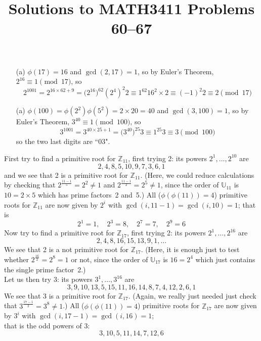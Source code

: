 \documentclass[11pt]{article}
\date{}
\author{}
\title{\sc Solutions to MATH3411 Problems 60--67}
\begin{document}
 \maketitle

\vspace*{-10mm}

\begin{itemize}
  \item[{(a)}] $\phi(17) = 16$ and $\gcd(2,17)=1$, so by Euler's Theorem, $2^{16}\equiv1\pmod{17}$, so
    \[2^{1001} = 2^{16\times 62+9} = \bigl(2^{16}\bigr)^{62}(2^4)^2 2 \equiv 1^{62}16^2\times2\equiv(-1)^2 2\equiv 2\pmod{17}\]
  \item[{(a)}] $\phi(100) = \phi(2^2)\phi(5^2) = 2\times 20 = 40$ and $\gcd(3,100)=1$, so by Euler's Theorem, $3^{40}\equiv1\pmod{100}$, so
    \[3^{1001} = 3^{40\times 25+1} = \bigl(3^{40}\bigr)^{25}3 \equiv 1^{25}3\equiv 3\pmod{100}\]
    so the two last digits are ``03".
\end{itemize}

\bigskip{}
First try to find a primitive root for $\mathbb{Z}_{11}$,
first trying 2: its powers $2^1,\ldots,2^{10}$ are
\[
  2, 4, 8, 5, 10, 9, 7, 3, 6, 1
\]
and we see that 2 is a primitive root for $\mathbb{Z}_{11}$.
(Here, we could reduce calculations by checking
that $2^\frac{11-1}{5} = 2^2 \neq 1$
and  $2^\frac{11-1}{2} = 2^5 \neq 1$,
since the order of $\mathbb{U}_{11}$ is $10 = 2\times 5$ which has prime factors~2 and~5.)
All ($\phi(\phi(11)) = 4$) primitive roots for $\mathbb{Z}_{11}$ are now given by $2^i$ with $\gcd(i,11-1) = \gcd(i,10) = 1$;
that is
\[
  2^1 = 1, \quad 2^3 = 8, \quad 2^7 = 7, \quad 2^9 = 6
\]
Now try to find a primitive root for $\mathbb{Z}_{17}$,
first trying 2: its powers $2^1,\ldots,2^{16}$ are
\[
  2, 4, 8, 16, 15, 13, 9, 1,\ldots
\]
We see that 2 is a not primitive root for $\mathbb{Z}_{17}$.
(Here, it is enough just to test whether $2^\frac{16}{2} = 2^8 = 1$ or not,
since the order of $\mathbb{U}_{17}$ is $16 = 2^4$ which just contains the single prime factor~2.)\\
Let us then try 3: its powers $3^1,\ldots,3^{16}$ are
\[
  3, 9, 10, 13, 5, 15, 11, 16, 14, 8, 7, 4, 12, 2, 6, 1
\]
We see that 3 is a primitive root for $\mathbb{Z}_{17}$.
(Again, we really just needed just check that $3^\frac{17-1}{2} = 3^8 \neq 1$.)
All ($\phi(\phi(11)) = 4$) primitive roots for $\mathbb{Z}_{17}$
are now given by $3^i$ with $\gcd(i,17-1) = \gcd(i,16) = 1$;\\
that is the odd powers of 3:
\[
  3, 10, 5, 11, 14, 7, 12, 6
\]
\end{document}
